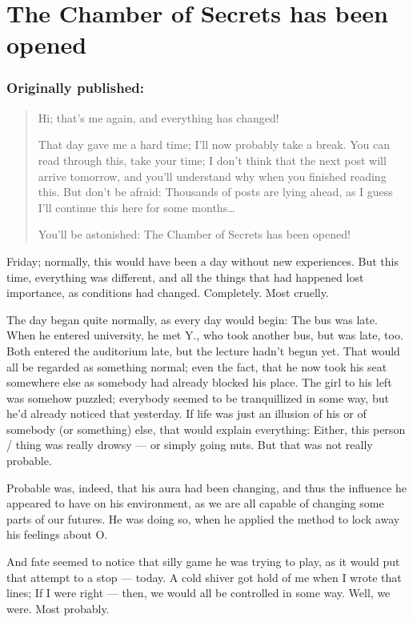 \chapter{The Chamber of Secrets has been opened}
\label{cha:chamber-secrets-has-opened}
\subsection*{Originally published: }
\begin{quote}
Hi; that's me again, and everything has changed!

That day gave me a hard time; I'll now probably take a break. You can read through this, take your time; I don't think that the next post will arrive tomorrow, and you'll understand why when you finished reading this. 
But don't be afraid: Thousands of posts are lying ahead, as I guess I'll continue this here for some months\dots{}

You'll be astonished: The Chamber of Secrets has been opened!
\end{quote}

Friday; normally, this would have been a day without new experiences. But this time, everything was different, and all the things that had happened lost importance, as conditions had changed. 
Completely. 
Most cruelly.

The day began quite normally, as every day would begin: The bus was late. 
When he entered university, he met Y., who took another bus, but was late, too. 
Both entered the auditorium late, but the lecture hadn't begun yet. 
That would all be regarded as something normal; even the fact, that he now took his seat somewhere else as somebody had already blocked his place. 
The girl to his left was somehow puzzled; everybody seemed to be tranquillized in some way, but he'd already noticed that yesterday. If life was just an illusion of his or of somebody (or something) else, that would explain everything: Either, this person / thing was really drowsy --- or simply going nuts. 
But that was not really probable.

Probable was, indeed, that his aura had been changing, and thus the influence he appeared to have on his environment, as we are all capable of changing some parts of our futures. 
He was doing so, when he applied the method to lock away his feelings about O.

And fate seemed to notice that silly game he was trying to play, as it would put that attempt to a stop --- today. 
A cold shiver got hold of me when I wrote that lines; If I were right --- then, we would all be controlled in some way. 
Well, we were. 
Most probably.

